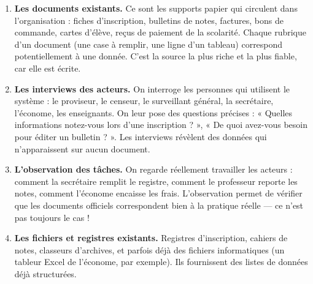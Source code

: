 \documentclass[11pt]{article}
\begin{document}
\begin{enumerate}
  \item \textbf{Les documents existants.} Ce sont les supports papier qui circulent dans l'organisation : fiches d'inscription, bulletins de notes, factures, bons de commande, cartes d'élève, reçus de paiement de la scolarité. Chaque rubrique d'un document (une case à remplir, une ligne d'un tableau) correspond potentiellement à une donnée. C'est la source la plus riche et la plus fiable, car elle est écrite.
  \item \textbf{Les interviews des acteurs.} On interroge les personnes qui utilisent le système : le proviseur, le censeur, le surveillant général, la secrétaire, l'économe, les enseignants. On leur pose des questions précises : « Quelles informations notez-vous lors d'une inscription ? », « De quoi avez-vous besoin pour éditer un bulletin ? ». Les interviews révèlent des données qui n'apparaissent sur aucun document.
  \item \textbf{L'observation des tâches.} On regarde réellement travailler les acteurs : comment la secrétaire remplit le registre, comment le professeur reporte les notes, comment l'économe encaisse les frais. L'observation permet de vérifier que les documents officiels correspondent bien à la pratique réelle — ce n'est pas toujours le cas !
  \item \textbf{Les fichiers et registres existants.} Registres d'inscription, cahiers de notes, classeurs d'archives, et parfois déjà des fichiers informatiques (un tableur Excel de l'économe, par exemple). Ils fournissent des listes de données déjà structurées.
\end{enumerate}
\end{document}
